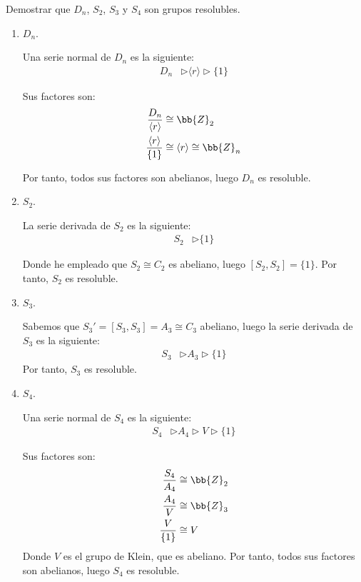 \begin{ejercicio}
    Demostrar que $D_n$, $S_2$, $S_3$ y $S_4$ son grupos resolubles.
    \begin{enumerate}
        \item $D_n$.
        
        Una serie normal de $D_n$ es la siguiente:
        \begin{align*}
            D_n &\rhd \langle r \rangle \rhd \{1\}
        \end{align*}

        Sus factores son:
        \begin{align*}
            \dfrac{D_n}{\langle r \rangle} &\cong \bb{Z}_2 \\
            \dfrac{\langle r \rangle}{\{1\}} &\cong \langle r \rangle \cong \bb{Z}_n
        \end{align*}

        Por tanto, todos sus factores son abelianos, luego $D_n$ es resoluble.

        \item $S_2$.
        
        La serie derivada de $S_2$ es la siguiente:
        \begin{align*}
            S_2 &\rhd \{1\}
        \end{align*}

        Donde he empleado que $S_2\cong C_2$ es abeliano, luego $[S_2, S_2]=\{1\}$.
        Por tanto, $S_2$ es resoluble.

        \item $S_3$.
        
        Sabemos que $S_3'=[S_3, S_3]=A_3\cong C_3$ abeliano, luego la serie derivada de $S_3$ es la siguiente:
        \begin{align*}
            S_3 &\rhd A_3 \rhd \{1\}
        \end{align*}
        Por tanto, $S_3$ es resoluble.

        \item $S_4$.
        
        Una serie normal de $S_4$ es la siguiente:
        \begin{align*}
            S_4 &\rhd A_4 \rhd V \rhd \{1\}
        \end{align*}

        Sus factores son:
        \begin{align*}
            \dfrac{S_4}{A_4} &\cong \bb{Z}_2 \\
            \dfrac{A_4}{V} &\cong \bb{Z}_3 \\
            \dfrac{V}{\{1\}} &\cong V
        \end{align*}
        Donde $V$ es el grupo de Klein, que es abeliano. Por tanto, todos sus factores son abelianos, luego $S_4$ es resoluble.        
    \end{enumerate}
\end{ejercicio}

